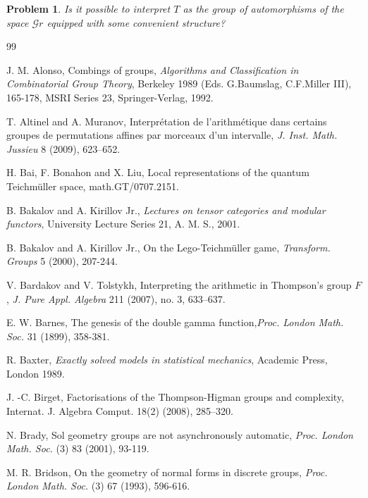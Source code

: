 \documentclass[twoside]{irmaems}
\theoremstyle{plain}
\newtheorem{problem}{Problem}
\theoremstyle{definition}
\theoremstyle{remark}
\begin{document}
\begin{problem}
Is it possible to interpret $T$ as the group of automorphisms of the space ${\mathcal Gr}$ equipped with some convenient structure? 
\end{problem}






\begin{small}
\begin{thebibliography}{99}

J. M. Alonso, Combings of groups, {\em Algorithms and Classification in 
Combinatorial Group Theory}, Berkeley 1989 
(Eds. G.Baumslag, C.F.Miller III),  165-178,
MSRI Series 23, Springer-Verlag, 1992. 

T. Altinel and A. Muranov, 
Interpr\'etation de l'arithm\'etique dans certains groupes de 
permutations affines par morceaux d'un intervalle, 
{\em J. Inst. Math. Jussieu} 8 (2009), 623--652. 


H. Bai, F. Bonahon and X. Liu, {  Local representations of the 
quantum Teichm\"uller space}, 
math.GT/0707.2151.  



B. Bakalov and A. Kirillov Jr.,          
{\em Lectures on tensor categories and modular functors},          
 University Lecture Series 21, A. M. S., 2001.         
         
B. Bakalov and A. Kirillov Jr.,         
{ On the Lego-Teichm\"uller game},          
{\em Transform. Groups} 5 (2000),  207-244.   


V. Bardakov and  V. Tolstykh, Interpreting the arithmetic in 
Thompson's group $F$, {\em   J. Pure Appl. Algebra}  211  (2007),  no. 3, 
633--637. 

E. W. Barnes, {The genesis of the double gamma function},{\em  Proc. London Math. Soc.} 31 (1899), 358-381. 

R. Baxter, {\em Exactly solved models in statistical mechanics}, Academic Press, London 1989. 


J. -C. Birget, Factorisations of the Thompson-Higman groups and
complexity, {\rm Internat. J. Algebra  Comput.} 18(2) (2008), 285--320.

N. Brady, {
 Sol geometry groups are not asynchronously automatic},
{\em Proc. London Math. Soc.} (3) 83 (2001), 93-119.


M. R. Bridson, {
On the geometry of normal forms in discrete groups}, 
{\em Proc. London Math. Soc.} (3) 67 (1993), 596-616.


\end{thebibliography}
\end{small}
\end{document}
